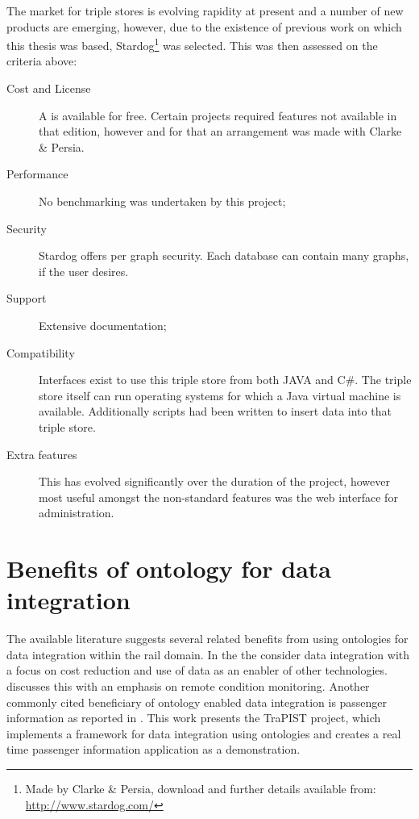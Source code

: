 The market for triple stores is evolving rapidity at present and a number of new products are emerging, however, due to the existence of previous work on which this thesis was based, Stardog\footnote{Made by Clarke \& Persia, download and further details available from: \url{http://www.stardog.com/}} was selected. This was then assessed on the criteria above:

\begin{description}    
    \item[Cost and License] A  is available for free. Certain projects required features not available in that edition, however and for that an arrangement was made with Clarke \& Persia.
    \item[Performance] No benchmarking was undertaken by this project;
    \item[Security] Stardog offers per graph security. Each database can contain many graphs, if the user desires.
    \item[Support] Extensive documentation;
    \item[Compatibility] Interfaces exist to use this triple store from both JAVA and C\#. The triple store itself can run operating systems for which a Java virtual machine is available.  Additionally scripts had been written to insert data into that triple store.
    \item[Extra features] This has evolved significantly over the duration of the project, however most useful amongst the non-standard features was the web interface for administration. 
\end{description}


\section{Benefits of ontology for data integration}
\label{benefits}
The available literature suggests several related benefits from using ontologies for data integration within the rail domain. In the  the \citet{RDG2017} consider data integration with a focus on cost reduction and use of data as an enabler of other technologies. \citet{Tutcher2013} discusses this with an emphasis on remote condition monitoring. Another commonly cited beneficiary of ontology enabled data integration is passenger information as reported in  \citet{Verstichel2014}. This work presents the TraPIST project, which implements a framework for data integration using ontologies and creates a real time passenger information application as a demonstration.

